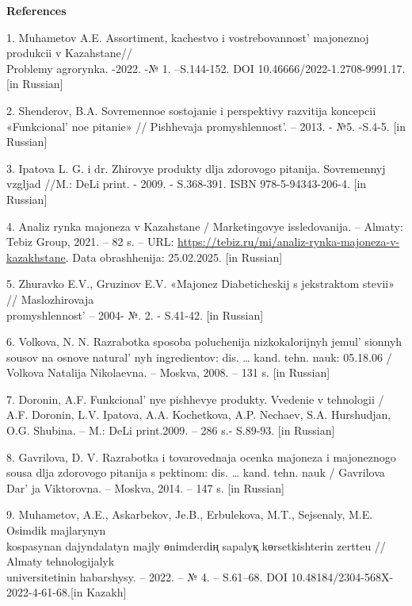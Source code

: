 \begin{center}
{\bfseries References}
\end{center}

\begin{references}
1. Muhametov A.E. Assortiment, kachestvo i
vostrebovannost'{} majoneznoj produkcii v Kazahstane//\\
Problemy agrorynka. -2022. -№ 1. --S.144-152. DOI
10.46666/2022-1.2708-9991.17. {[}in Russian{]}

2. Shenderov, B.A. Sovremennoe sostojanie i perspektivy razvitija
koncepcii «Funkcional' noe pitanie» // Pishhevaja
promyshlennost'. -- 2013. - №5. -S.4-5. {[}in Russian{]}

3. Ipatova L. G. i dr. Zhirovye produkty dlja zdorovogo pitanija.
Sovremennyj vzgljad //M.: DeLi print. - 2009. - S.368-391. ISBN
978-5-94343-206-4. {[}in Russian{]}

4. Analiz rynka majoneza v Kazahstane / Marketingovye issledovanija. --
Almaty: Tebiz Group, 2021. -- 82 s. -- URL:
\url{https://tebiz.ru/mi/analiz-rynka-majoneza-v-kazakhstane}. Data
obrashhenija: 25.02.2025. {[}in Russian{]}

5. Zhuravko E.V., Gruzinov E.V. «Majonez Diabeticheskij s jekstraktom
stevii» // Maslozhirovaja \\promyshlennost'{} -- 2004- №.
2. - S.41-42. {[}in Russian{]}

6. Volkova, N. N. Razrabotka sposoba poluchenija nizkokalorijnyh
jemul' sionnyh sousov na osnove
natural' nyh ingredientov: dis. \ldots{} kand. tehn.
nauk: 05.18.06 / Volkova Natalija Nikolaevna. -- Moskva, 2008. -- 131 s.
{[}in Russian{]}

7. Doronin, A.F. Funkcional' nye pishhevye produkty.
Vvedenie v tehnologii / A.F. Doronin, L.V. Ipatova, A.A. Kochetkova,
A.P. Nechaev, S.A. Hurshudjan, O.G. Shubina. -- M.: DeLi print.2009. --
286 s.- S.89-93. {[}in Russian{]}

8. Gavrilova, D. V. Razrabotka i tovarovednaja ocenka majoneza i
majoneznogo sousa dlja zdorovogo pitanija s pektinom: dis. \ldots{}
kand. tehn. nauk / Gavrilova Dar' ja Viktorovna. --
Moskva, 2014. -- 147 s. {[}in Russian{]}

9. Muhametov, A.E., Askarbekov, Je.B., Erbulekova, M.T., Sejsenaly, M.E.
Osіmdіk majlarynyn \\kospasynan dajyndalatyn majly өnіmderdің sapalyқ
kөrsetkіshterіn zertteu // Almaty tehnologijalyk \\universitetіnin
habarshysy. -- 2022. -- № 4. -- S.61--68. DOI
10.48184/2304-568X-2022-4-61-68.{[}in Kazakh{]}


\end{references}
